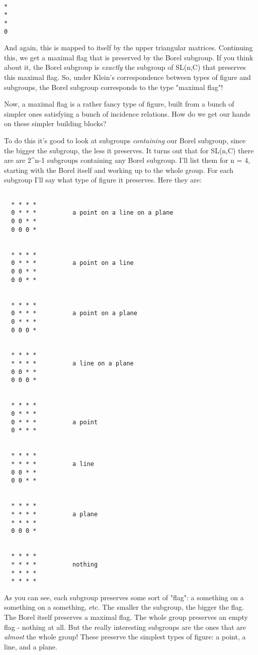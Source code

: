 \begin{verbatim}

*
*
*
0
\end{verbatim}
    
And again, this is mapped to itself by the upper triangular matrices.
Continuing this, we get a maximal flag that is preserved by the
Borel subgroup.  If you think about it, the Borel subgroup is
\emph{exactly} the subgroup of SL(n,C) that preserves this maximal flag.    
So, under Klein's correspondence between types of figure and subgroups,
the Borel subgroup corresponds to the type "maximal flag"!

Now, a maximal flag is a rather fancy type of figure, built from a bunch
of simpler ones satisfying a bunch of incidence relations.  How do we
get our hands on these simpler building blocks?

To do this it's good to look at subgroups \emph{containing} our Borel
subgroup, since the bigger the subgroup, the less it preserves.  It
turns out that for SL(n,C) there are are 2^{n-1} subgroups containing
any Borel subgroup.  I'll list them for n = 4, starting with the Borel
itself and working up to the whole group.  For each subgroup I'll say
what type of figure it preserves.  Here they are:



\begin{verbatim}

  * * * *
  0 * * *          a point on a line on a plane    
  0 0 * *
  0 0 0 *


  * * * *
  0 * * *          a point on a line
  0 0 * *
  0 0 * *


  * * * *
  0 * * *          a point on a plane
  0 * * *
  0 0 0 *


  * * * *
  * * * *          a line on a plane
  0 0 * *
  0 0 0 *


  * * * *
  0 * * *                            
  0 * * *          a point
  0 * * *


  * * * *
  * * * *          a line
  0 0 * *
  0 0 * *


  * * * *
  * * * *          a plane
  * * * *
  0 0 0 *


  * * * *
  * * * *          nothing
  * * * *
  * * * *
\end{verbatim}
    

As you can see, each subgroup preserves some sort of "flag": a
something on a something on a something, etc.  The smaller the subgroup,
the bigger the flag.  The Borel itself preserves a maximal flag.  The
whole group preserves an empty flag - nothing at all.  But the really
interesting subgroups are the ones that are \emph{almost} the whole group!
These preserve the simplest types of figure: a point, a line, and a
plane.

